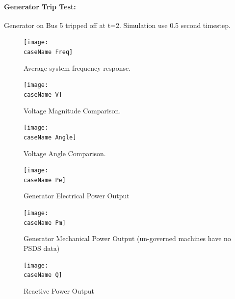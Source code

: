 \documentclass[12pt]{article}
\begin{document}
\pagebreak
\newcommand{\caseName}{SixMachineTrip0}
\paragraph{Generator Trip Test:} Generator on Bus 5 tripped off at t=2. Simulation use 0.5 second timestep.
	\begin{figure}[h!]
			\centering
			\texttt{[image: \\caseName Freq]}\vspace{-.5em}
			\caption{Average system frequency response.}
			\label{\caseName F}		 
	\end{figure}%


	\begin{figure}[h!]
			\centering
			\texttt{[image: \\caseName V]}\vspace{-.5em}
			\caption{Voltage Magnitude Comparison.}
			\label{\caseName Vm}		 
	\end{figure}%

	\begin{figure}[h!]
			\centering
			\texttt{[image: \\caseName Angle]}\vspace{-.5em}
			\caption{Voltage Angle Comparison.}
			\label{\caseName Va}		 
	\end{figure}%


%
\pagebreak
	\begin{figure}[h!]
			\centering
			\texttt{[image: \\caseName Pe]}\vspace{-.5em}
			\caption{Generator Electrical Power Output}
			\label{\caseName Pe}		 
	\end{figure}%
	\begin{figure}[h!]
			\centering
			\texttt{[image: \\caseName Pm]}\vspace{-.5em}
			\caption{Generator Mechanical Power Output (un-governed machines have no PSDS data)}
			\label{\caseName Pm}		 
	\end{figure}%

	\begin{figure}[h!]
			\centering
			\texttt{[image: \\caseName Q]}\vspace{-.5em}
			\caption{Reactive Power Output}
			\label{\caseName Q}		 
	\end{figure}%
\end{document}
